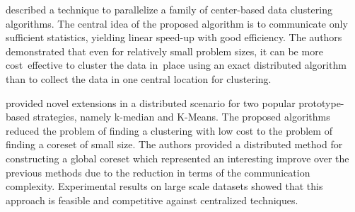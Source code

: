 \documentclass[10pt]{article}
\begin{document}
\citep{FZ00} described a technique to parallelize a family of center-based data clustering algorithms. The central idea of the proposed algorithm is to communicate only sufficient statistics, yielding linear speed-up with good efficiency. 
The authors demonstrated that even for relatively small problem sizes, it can be more cost~effective to cluster the data in~place using an exact distributed algorithm than to collect the data in one central location for clustering.


\citep{BEL13} provided novel extensions in a distributed scenario for two popular prototype-based strategies, namely k-median and K-Means. 
The proposed algorithms reduced the problem of finding a clustering with low cost to the problem of finding a coreset of small size. The authors provided a distributed method for constructing a global coreset which represented an interesting improve over the previous methods due to the reduction in terms of the communication complexity. Experimental results on large scale datasets showed that this approach is feasible and competitive against centralized techniques. 

\end{document}
